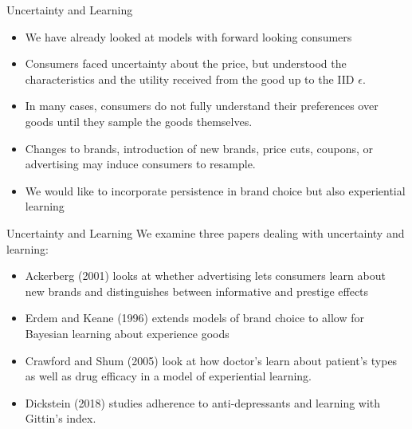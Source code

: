 \begin{frame}{Uncertainty and Learning}
\begin{itemize}
\item We have already looked at models with forward looking consumers
\item Consumers faced uncertainty about the price, but understood the characteristics and the utility received from the good up to the IID $\epsilon$.
\item In many cases, consumers do not fully understand their preferences over goods until they sample the goods themselves.
\item Changes to brands, introduction of new brands, price cuts, coupons, or advertising may induce consumers to resample.
\item We would like to incorporate \alert{persistence} in brand choice but also \alert{experiential learning}
\end{itemize}
\end{frame} 


 
\begin{frame}{Uncertainty and Learning}
We examine three papers dealing with uncertainty and learning:
\begin{itemize}
\item Ackerberg (2001) looks at whether advertising lets consumers learn about new brands and distinguishes between informative and prestige effects
\item Erdem and Keane (1996) extends models of brand choice to allow for Bayesian learning about experience goods
\item Crawford and Shum (2005) look at how doctor's learn about patient's types as well as drug efficacy in a model of experiential learning.
\item Dickstein (2018) studies adherence to anti-depressants and learning with Gittin's index.
\end{itemize}
\end{frame}

